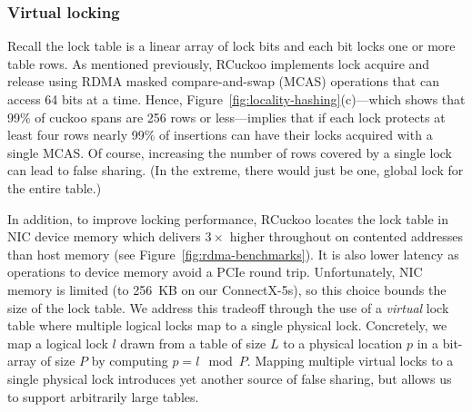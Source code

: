 
\subsubsection{Virtual locking}
\label{sec:locking}

Recall the lock table is a linear array of lock bits and each bit
locks one or more table rows.  As mentioned previously, RCuckoo
implements lock acquire and release using RDMA masked compare-and-swap
(MCAS) operations that can access 64 bits at a time.  Hence,
Figure~\ref{fig:locality-hashing}(c)---which shows that 99\% of cuckoo
spans are 256 rows or less---implies that if each lock protects at
least four rows nearly 99\% of insertions can have their locks
acquired with a single MCAS.  Of course, increasing the number of rows
covered by a single lock can lead to false sharing.  (In the extreme,
there would just be one, global lock for the entire table.)

In addition, to improve locking performance, RCuckoo locates the lock
table in NIC device memory which delivers $3\times$ higher throughout
on contented addresses than host memory (see
Figure~\ref{fig:rdma-benchmarks}). It is also lower latency as
operations to device memory avoid a PCIe round trip.  Unfortunately,
NIC memory is limited (to 256~KB on our ConnectX-5s), so this choice
bounds the size of the lock table.
%
We address this tradeoff through the use of a \textit{virtual} lock
table where multiple logical locks map to a single physical lock.
Concretely, we map a logical lock $l$ drawn from a table of size $L$
to a physical location $p$ in a bit-array of size $P$ by computing $p
= l \mod P$.  Mapping multiple virtual locks to a single physical lock
introduces yet another source of false sharing, but allows us to
support arbitrarily large tables.

